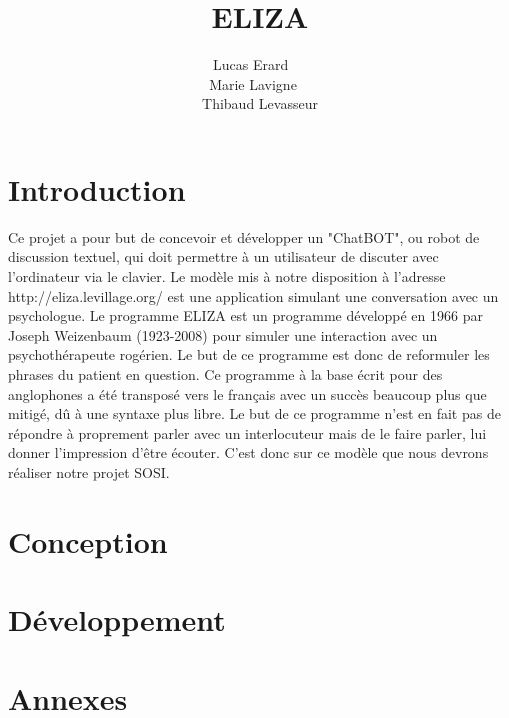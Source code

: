 \documentclass[a4paper,12pt]{article}
\title{ELIZA}
\author{Lucas Erard ~~\\ Marie Lavigne~~\\ Thibaud Levasseur}
\begin{document}
\maketitle
\newpage
\tableofcontents
\newpage
\section{Introduction}
Ce projet a pour but de concevoir et développer un "ChatBOT", ou robot de discussion textuel, qui doit permettre à un utilisateur de discuter avec l'ordinateur via le clavier. Le modèle mis à notre disposition à l'adresse http://eliza.levillage.org/ est une application simulant une conversation avec un psychologue.
Le programme ELIZA est un programme développé en 1966 par Joseph Weizenbaum (1923-2008) pour simuler une interaction avec un psychothérapeute rogérien. Le but de ce programme est donc de reformuler les phrases du patient en question.
Ce programme à la base écrit pour des anglophones a été transposé vers le français avec un succès beaucoup plus que mitigé, dû à une syntaxe plus libre.
Le but de ce programme n'est en fait pas de répondre à proprement parler avec un interlocuteur mais de le faire parler, lui donner l'impression d'être écouter.
C'est donc sur ce modèle que nous devrons réaliser notre projet SOSI.
\section{Conception}
\section{Développement}
\section{Annexes}
\end{document}
